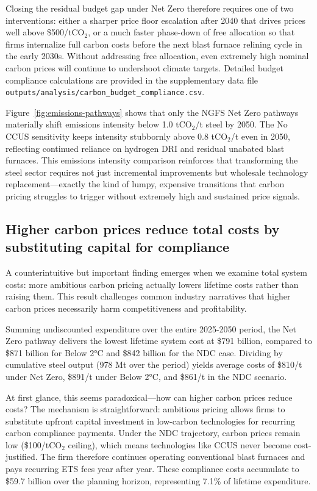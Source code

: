 \documentclass[preprint,1p,authoryear]{elsarticle}
\begin{document}
Closing the residual budget gap under Net Zero therefore requires one of two interventions: either a sharper price floor escalation after 2040 that drives prices well above \$500/tCO$_2$, or a much faster phase-down of free allocation so that firms internalize full carbon costs before the next blast furnace relining cycle in the early 2030s. Without addressing free allocation, even extremely high nominal carbon prices will continue to undershoot climate targets. Detailed budget compliance calculations are provided in the supplementary data file \texttt{outputs/analysis/carbon\_budget\_compliance.csv}.

Figure~\ref{fig:emissions-pathways} shows that only the NGFS Net Zero pathways materially shift emissions intensity below 1.0 tCO$_2$/t steel by 2050. The No CCUS sensitivity keeps intensity stubbornly above 0.8 tCO$_2$/t even in 2050, reflecting continued reliance on hydrogen DRI and residual unabated blast furnaces. This emissions intensity comparison reinforces that transforming the steel sector requires not just incremental improvements but wholesale technology replacement—exactly the kind of lumpy, expensive transitions that carbon pricing struggles to trigger without extremely high and sustained price signals.

\subsection{Higher carbon prices reduce total costs by substituting capital for compliance}

A counterintuitive but important finding emerges when we examine total system costs: more ambitious carbon pricing actually lowers lifetime costs rather than raising them. This result challenges common industry narratives that higher carbon prices necessarily harm competitiveness and profitability.

Summing undiscounted expenditure over the entire 2025-2050 period, the Net Zero pathway delivers the lowest lifetime system cost at \$791 billion, compared to \$871 billion for Below 2°C and \$842 billion for the NDC case. Dividing by cumulative steel output (978 Mt over the period) yields average costs of \$810/t under Net Zero, \$891/t under Below 2°C, and \$861/t in the NDC scenario.

At first glance, this seems paradoxical—how can higher carbon prices reduce costs? The mechanism is straightforward: ambitious pricing allows firms to substitute upfront capital investment in low-carbon technologies for recurring carbon compliance payments. Under the NDC trajectory, carbon prices remain low (\$100/tCO$_2$ ceiling), which means technologies like CCUS never become cost-justified. The firm therefore continues operating conventional blast furnaces and pays recurring ETS fees year after year. These compliance costs accumulate to \$59.7 billion over the planning horizon, representing 7.1\% of lifetime expenditure.
\end{document}
